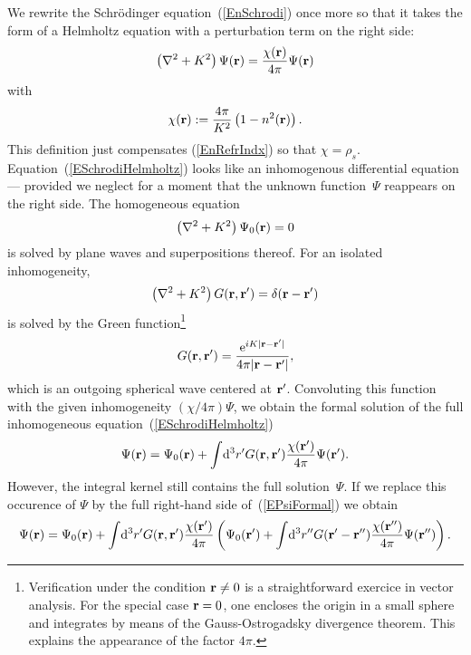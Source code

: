 We rewrite the Schrödinger equation~(\ref{EnSchrodi})
once more so that it takes the form of a Helmholtz equation
with a perturbation term on the right side:
\begin{equation}\label{ESchrodiHelmholtz}
  \left(\mathbf{\nabla}^2+K^2\right)\Psi(\mathbf{r})
  = \frac{\chi(\mathbf{r})}{4\pi}\Psi(\mathbf{r})
\end{equation}
with
\begin{equation}\label{EChiDef}
  \chi(\mathbf{r}) := \frac{4\pi}{K^2}\left(1-n^2(\mathbf{r})\right).
\end{equation}
This definition just compensates (\ref{EnRefrIndx}) so that $\chi=\rho_s$.
Equation~(\ref{ESchrodiHelmholtz}) looks
like an inhomogenous differential equation ---
provided we neglect for a moment that the unknown function~$\Psi$
reappears on the right side.
The homogeneous equation
\begin{equation}\label{EHelmholtzHomog}
  \left(\mathbf{\nabla}^2+K^2\right)\Psi_0(\mathbf{r}) = 0
\end{equation}
is solved by plane waves and superpositions thereof.
For an isolated inhomogeneity,
\begin{equation}\label{EHelmholtzForGreen}
  \left(\mathbf{\nabla}^2+K^2\right)G(\mathbf{r},\mathbf{r}') = \delta(\mathbf{r}-\mathbf{r}')
\end{equation}
is solved by the Green function\footnote
{Verification under the condition $\mathbf{r}\ne0$
is a straightforward exercice in vector analysis.
For the special case $\mathbf{r}=0$,
one encloses the origin in a small sphere
and integrates by means of the Gauss-Ostrogadsky divergence theorem.
This explains the appearance of the factor $4\pi$.}
\begin{equation}\label{EGreens1}
  G(\mathbf{r},\mathbf{r}') = \frac{{\rm e}^{iK|\mathbf{r}-\mathbf{r}'|}}{4\pi |\mathbf{r}-\mathbf{r}'|},
\end{equation}
which is an outgoing spherical wave centered at $\mathbf{r}'$.
Convoluting this function with the given inhomogeneity $(\chi/4\pi)\Psi$,
we obtain the formal solution
of the full inhomogeneous equation~(\ref{ESchrodiHelmholtz})
\begin{equation}\label{EPsiFormal}
  \Psi(\mathbf{r})
  = \Psi_0(\mathbf{r})
  + \int\!{\rm d}^3r' G(\mathbf{r},\mathbf{r}')
                     \frac{\chi(\mathbf{r}')}{4\pi}\Psi(\mathbf{r}').
\end{equation}
However, the integral kernel still contains the full solution~$\Psi$.
If we replace this occurence of $\Psi$
by the full right-hand side of~(\ref{EPsiFormal})
we obtain
\begin{equation}
  \Psi(\mathbf{r})
  = \Psi_0(\mathbf{r})
  + \int\!{\rm d}^3r' G(\mathbf{r},\mathbf{r}')\frac{\chi(\mathbf{r}')}{4\pi}
  \left(\Psi_0(\mathbf{r}')
  + \int\!{\rm d}^3r''
  G(\mathbf{r}'-\mathbf{r''})\frac{\chi(\mathbf{r''})}{4\pi}
  \Psi(\mathbf{r''})\right).
\end{equation}

